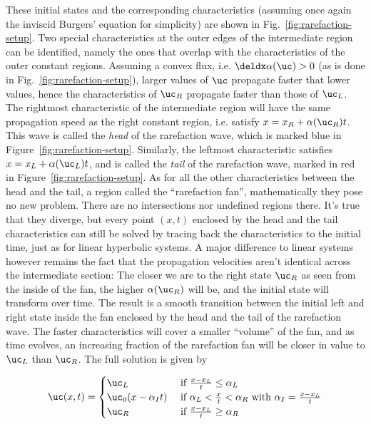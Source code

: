 These initial states and the corresponding characteristics (assuming once again the inviscid
Burgers' equation for simplicity) are shown in Fig.~\ref{fig:rarefaction-setup}. Two special
characteristics at the outer edges of the intermediate region can be identified, namely the ones
that overlap with the characteristics of the outer constant regions. Assuming a convex flux, i.e.
$\deldx \alpha(\uc) > 0$  (as is done in Fig.~\ref{fig:rarefaction-setup}), larger values of $\uc$
propagate faster that lower values, hence the characteristics of $\uc_R$ propagate faster than
those of $\uc_L$. The rightmost characteristic of the intermediate region will have the same
propagation speed as the right constant region, i.e. satisfy $x = x_R + \alpha(\uc_R)t$. This wave
is called the \emph{head} of the rarefaction wave, which is marked blue in
Figure~\ref{fig:rarefaction-setup}. Similarly, the leftmost characteristic satisfies $x = x_L +
\alpha(\uc_L) t$, and is called the \emph{tail} of the rarefaction wave, marked in red in
Figure~\ref{fig:rarefaction-setup}. As for all the other characteristics between the head and the
tail, a region called the ``rarefaction fan'', mathematically they pose no new problem. There are
no intersections nor undefined regions there. It's true that they diverge, but every point $(x, t)$
enclosed by the head and the tail characteristics can still be solved by tracing back the
characteristics to the initial time, just as for linear hyperbolic systems. A major difference to
linear systems however remains the fact that the propagation velocities aren't identical across the
intermediate section: The closer we are to the right state $\uc_R$ as seen from the inside of the
fan, the higher $\alpha(\uc_R)$ will be, and the initial state will transform over time. The result
is a smooth transition between the initial left and right state inside the fan enclosed by the head
and the tail of the rarefaction wave. The faster characteristics will cover a smaller ``volume'' of
the fan, and as time evolves, an increasing fraction of the rarefaction fan will be closer in value
to $\uc_L$ than $\uc_R$. The full solution is given by

\begin{align}
\uc(x, t) = \begin{cases}
            \uc_L                   & \text{ if } \frac{x - x_L}{t} \leq \alpha_L \\
            \uc_0(x - \alpha_I t)   & \text{ if } \alpha_L < \frac{x}{t} < \alpha_R
                \text{ with } \alpha_I = \frac{x - x_L}{t} \\
            \uc_R                   & \text{ if } \frac{x - x_L}{t} \geq \alpha_R
            \end{cases} \label{eq:rarefaction-solution-theory}
\end{align}

